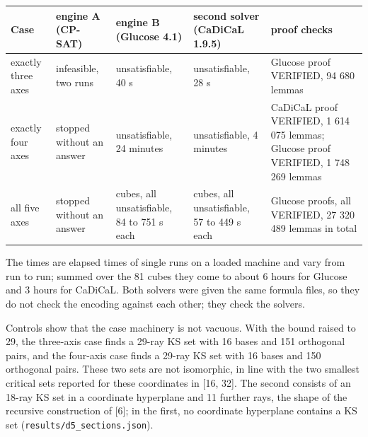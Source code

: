 \documentclass[11pt,a4paper]{article}
\begin{document}
{\def\LTcaptype{none} %
{\small
\begin{longtable}[]{@{}>{\raggedright\arraybackslash}p{}>{\raggedright\arraybackslash}p{}>{\raggedright\arraybackslash}p{}>{\raggedright\arraybackslash}p{}>{\raggedright\arraybackslash}p{}@{}}
\toprule\noalign{}
Case & engine A (CP-SAT) & engine B (Glucose 4.1) & second solver (CaDiCaL 1.9.5) & proof checks \\
\midrule\noalign{}
\endhead
\bottomrule\noalign{}
\endlastfoot
exactly three axes & infeasible, two runs & unsatisfiable, 40 s & unsatisfiable, 28 s & Glucose proof VERIFIED, 94 680 lemmas \\
exactly four axes & stopped without an answer & unsatisfiable, 24 minutes & unsatisfiable, 4 minutes & CaDiCaL proof VERIFIED, 1 614 075 lemmas; Glucose proof VERIFIED, 1 748 269 lemmas \\
all five axes & stopped without an answer & 81 cubes, all unsatisfiable, 84 to 751 s each & 81 cubes, all unsatisfiable, 57 to 449 s each & 81 Glucose proofs, all VERIFIED, 27 320 489 lemmas in total \\
\end{longtable}
}
}

The times are elapsed times of single runs on a loaded machine and vary from run to run; summed over
the 81 cubes they come to about 6 hours for Glucose and 3 hours for CaDiCaL. Both solvers were given
the same formula files, so they do not check the encoding against each other; they check the solvers.

Controls show that the case machinery is not vacuous. With the bound raised to 29, the three-axis
case finds a 29-ray KS set with 16 bases and 151 orthogonal pairs, and the four-axis case finds a
29-ray KS set with 16 bases and 150 orthogonal pairs. These two sets are not isomorphic, in line with
the two smallest critical sets reported for these coordinates in {[}16, 32{]}. The second consists of an
18-ray KS set in a coordinate hyperplane and 11 further rays, the shape of the recursive construction
of {[}6{]}; in the first, no coordinate hyperplane contains a KS set (\texttt{results/d5\_sections.json}).
\end{document}
